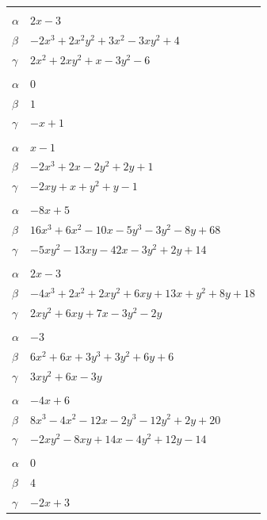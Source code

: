 \documentclass[11pt]{article}
\begin{document}
\begin{longtable}{@{}ll@{}}
\addlinespace[3pt]
\multicolumn{2}{@{}l}{$\{i,j\}=\{9,44\}$, $k_{ij}=7$}\\
$\alpha$ & $2x-3$\\
$\beta$ & $-2x^{3}+2x^{2}y^{2}+3x^{2}-3xy^{2}+4$\\
$\gamma$ & $2x^{2}+2xy^{2}+x-3y^{2}-6$\\
\addlinespace[3pt]
\multicolumn{2}{@{}l}{$\{i,j\}=\{9,49\}$, $k_{ij}=1$}\\
$\alpha$ & $0$\\
$\beta$ & $1$\\
$\gamma$ & $-x+1$\\
\addlinespace[3pt]
\multicolumn{2}{@{}l}{$\{i,j\}=\{9,56\}$, $k_{ij}=1$}\\
$\alpha$ & $x-1$\\
$\beta$ & $-2x^{3}+2x-2y^{2}+2y+1$\\
$\gamma$ & $-2xy+x+y^{2}+y-1$\\
\addlinespace[3pt]
\multicolumn{2}{@{}l}{$\{i,j\}=\{9,57\}$, $k_{ij}=7^{2}$}\\
$\alpha$ & $-8x+5$\\
$\beta$ & $16x^{3}+6x^{2}-10x-5y^{3}-3y^{2}-8y+68$\\
$\gamma$ & $-5xy^{2}-13xy-42x-3y^{2}+2y+14$\\
\addlinespace[3pt]
\multicolumn{2}{@{}l}{$\{i,j\}=\{9,58\}$, $k_{ij}=3\cdot 7$}\\
$\alpha$ & $2x-3$\\
$\beta$ & $-4x^{3}+2x^{2}+2xy^{2}+6xy+13x+y^{2}+8y+18$\\
$\gamma$ & $2xy^{2}+6xy+7x-3y^{2}-2y$\\
\addlinespace[3pt]
\multicolumn{2}{@{}l}{$\{i,j\}=\{9,63\}$, $k_{ij}=3^{2}$}\\
$\alpha$ & $-3$\\
$\beta$ & $6x^{2}+6x+3y^{3}+3y^{2}+6y+6$\\
$\gamma$ & $3xy^{2}+6x-3y$\\
\addlinespace[3pt]
\multicolumn{2}{@{}l}{$\{i,j\}=\{9,64\}$, $k_{ij}=2\cdot 7$}\\
$\alpha$ & $-4x+6$\\
$\beta$ & $8x^{3}-4x^{2}-12x-2y^{3}-12y^{2}+2y+20$\\
$\gamma$ & $-2xy^{2}-8xy+14x-4y^{2}+12y-14$\\
\addlinespace[3pt]
\multicolumn{2}{@{}l}{$\{i,j\}=\{9,96\}$, $k_{ij}=7$}\\
$\alpha$ & $0$\\
$\beta$ & $4$\\
$\gamma$ & $-2x+3$\\

\end{longtable}
\end{document}

